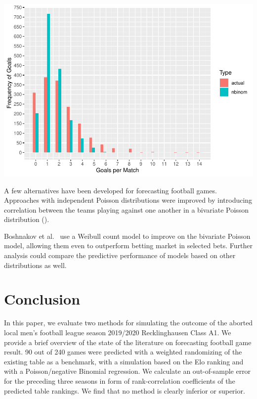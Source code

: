 \documentclass[12pt,a4paper]{article}
\let\origfigure\figure
\let\endorigfigure\endfigure
\renewenvironment{figure}[1][2] {
    \expandafter\origfigure\expandafter[H]
} {
    \endorigfigure
}
\begin{document}
\begin{figure}

{\centering \includegraphics{term_paper_eem_files/figure-latex/unnamed-chunk-7-1} 

}

\caption{Comparison of actual distribution of goals in all preceding seasons with the prediction from a negative binomial regression}\label{fig:unnamed-chunk-7}
\end{figure}

A few alternatives have been developed for forecasting football games.
Approaches with independent Poisson distributions were improved by
introducing correlation between the teams playing against one another in
a bivariate Poisson distribution (\textcite{karlis2003}).

Boshnakov et al.~\autocite*{boshnakov2016} use a Weibull count model to
improve on the bivariate Poisson model, allowing them even to outperform
betting market in selected bets. Further analysis could compare the
predictive performance of models based on other distributions as well.

\hypertarget{conclusion}{%
\section{Conclusion}\label{conclusion}}

In this paper, we evaluate two methods for simulating the outcome of the
aborted local men's football league season 2019/2020 Recklinghausen
Class A1. We provide a brief overview of the state of the literature on
forecasting football game result. 90 out of 240 games were predicted
with a weighted randomizing of the existing table as a benchmark, with a
simulation based on the Elo ranking and with a Poisson/negative Binomial
regression. We calculate an out-of-sample error for the preceding three
seasons in form of rank-correlation coefficients of the predicted table
rankings. We find that no method is clearly inferior or superior.
\end{document}
